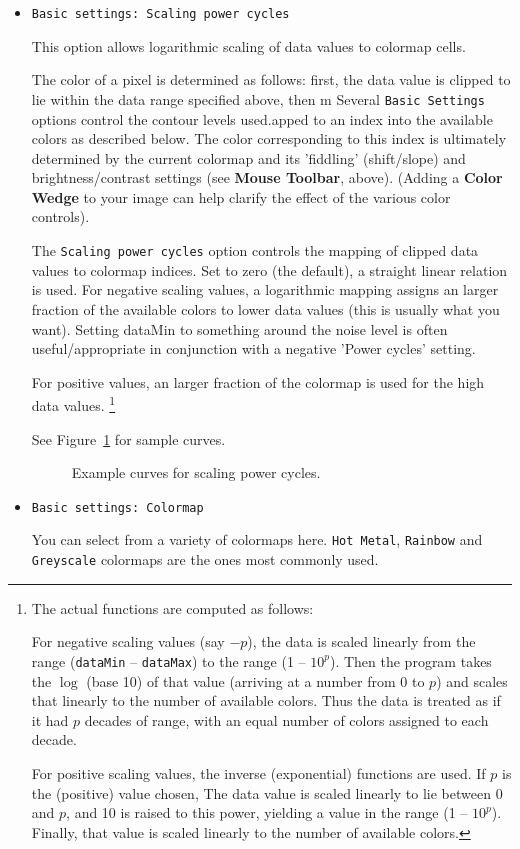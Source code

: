 \begin{itemize}
\item {\tt Basic settings: Scaling power cycles}

This option allows logarithmic scaling of data values to colormap cells.  

The color of a pixel is determined as follows: first, the data value is clipped
to lie within the data range specified above, then m Several {\tt Basic Settings} options control the contour
levels used.apped to an index into the
available colors as described below. The color corresponding to this index is
ultimately determined by the current colormap and its 'fiddling' (shift/slope)
and brightness/contrast settings (see {\bf Mouse Toolbar}, above).  (Adding a
{\bf Color Wedge} to your image can help clarify the effect of the various
color controls).

The {\tt Scaling power cycles} option controls the mapping of clipped data
values to colormap indices.  Set to zero (the default), a straight linear
relation is used.  For negative scaling values, a logarithmic mapping
assigns an larger fraction of the available colors to lower data values (this
is usually what you want). Setting dataMin to something around the noise level
is often useful/appropriate in conjunction with a negative 'Power cycles'
setting. 

For positive values, an larger fraction of the colormap is used for the high
data values.
\footnote{The actual functions are computed as follows:

For negative scaling values (say $-p$), the data is scaled linearly
from the range ({\tt dataMin} -- {\tt dataMax}) to the range (1 -- $10^{p}$).
Then the program takes the $\log$ (base 10) of that value (arriving at
a number from 0 to $p$) and scales that linearly to the number of
available colors.  Thus the data is treated as if it had $p$ decades
of range, with an equal number of colors assigned to each decade.

For positive scaling values, the inverse (exponential) functions are used.
If $p$ is the (positive) value chosen,  The data value is scaled linearly to
lie between 0 and $p$, and 10 is raised to this power, yielding a value in the
range (1 -- $10^{p}$).  Finally, that value is scaled linearly to the number
of available colors.}

See Figure~\ref{fig:scalingpower} for sample curves.
\begin{figure}[h]
\begin{center}
\caption{\label{fig:scalingpower} Example curves for scaling power cycles.}
\hrulefill
\end{center}
\end{figure}

\item {\tt Basic settings: Colormap}

You can select from a variety of colormaps here.  {\tt Hot Metal},
{\tt Rainbow} and {\tt Greyscale} colormaps are the ones most commonly used.

\end{itemize}



